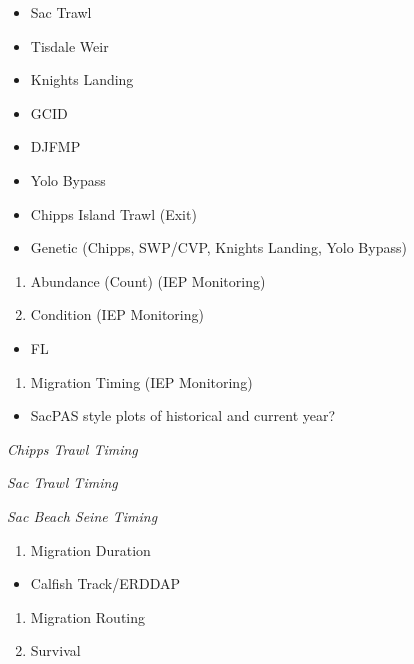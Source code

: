 \documentclass[
]{book}
\providecommand{\tightlist}{%
  \setlength{\itemsep}{0pt}\setlength{\parskip}{0pt}}
\theoremstyle{definition}
\theoremstyle{definition}
\theoremstyle{definition}
\theoremstyle{definition}
\theoremstyle{remark}
\begin{document}
\begin{itemize}
\tightlist
\item
  Sac Trawl
\item
  Tisdale Weir
\item
  Knights Landing
\item
  GCID
\item
  DJFMP
\item
  Yolo Bypass
\item
  Chipps Island Trawl (Exit)
\item
  Genetic (Chipps, SWP/CVP, Knights Landing, Yolo Bypass)
\end{itemize}

\begin{enumerate}
\def\labelenumi{\arabic{enumi}.}
\item
  Abundance (Count) (IEP Monitoring)
\item
  Condition (IEP Monitoring)
\end{enumerate}

\begin{itemize}
\tightlist
\item
  FL
\end{itemize}

\begin{enumerate}
\def\labelenumi{\arabic{enumi}.}
\setcounter{enumi}{2}
\tightlist
\item
  Migration Timing (IEP Monitoring)
\end{enumerate}

\begin{itemize}
\tightlist
\item
  SacPAS style plots of historical and current year?
\end{itemize}

\emph{Chipps Trawl Timing}

\emph{Sac Trawl Timing}

\emph{Sac Beach Seine Timing}

\begin{enumerate}
\def\labelenumi{\arabic{enumi}.}
\setcounter{enumi}{3}
\tightlist
\item
  Migration Duration
\end{enumerate}

\begin{itemize}
\tightlist
\item
  Calfish Track/ERDDAP
\end{itemize}

\begin{enumerate}
\def\labelenumi{\arabic{enumi}.}
\setcounter{enumi}{4}
\item
  Migration Routing
\item
  Survival
\end{enumerate}
\end{document}
